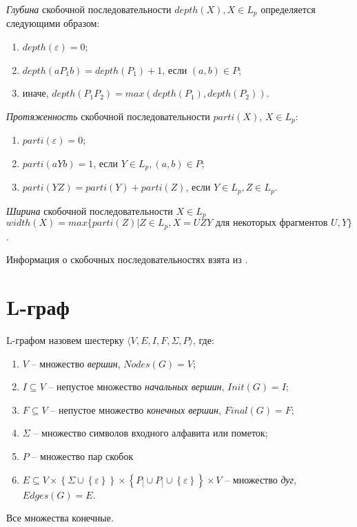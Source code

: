 \emph{Глубина} скобочной последовательности $depth(X), X \in L_p$ определяется следующими образом:
\begin{enumerate}[label=\arabic*)]
    \item $depth(\varepsilon) = 0$;
    \item $depth(a P_1 b) = depth(P_1) + 1$, если $(a, b) \in P$;
    \item иначе, $depth(P_1 P_2) = max(depth(P_1), depth(P_2))$.
\end{enumerate}

\emph{Протяженность} скобочной последовательности $parti(X)$, $X \in L_p$:
\begin{enumerate}[label=\arabic*)]
    \item $parti(\varepsilon) = 0$;
    \item $parti(aYb) = 1$, если $Y \in L_p, (a, b) \in P$;
    \item $parti(YZ) = parti(Y) + parti(Z)$, если $Y \in L_p, Z \in L_p$.
\end{enumerate}

\emph{Ширина} скобочной последовательности $X \in L_p$ $width(X) = max \{ parti(Z) \vert Z \in L_p, X = UZY \text{ для некоторых фрагментов } U, Y \}$.

Информация о скобочных последовательностях взята из \cite{stan1}.

\section{L-граф}
L-графом назовем шестерку $\langle V,E,I,F,\Sigma,P\rangle$, где:
\begin{enumerate}[label=\arabic*)]
    \item $V$ -- множество \emph{вершин}, $Nodes(G) = V$;
    \item $I \subseteq V$ -- непустое множество \emph{начальных вершин}, $Init(G) = I$;
    \item $F \subseteq V$ -- непустое множество \emph{конечных вершин}, $Final(G) = F$;
    \item $\Sigma$ -- множество символов входного алфавита или пометок;
    \item $P$ -- множество пар скобок
    \item $E \subseteq V 
                    \times \left\{ \Sigma \cup \left\{ \varepsilon \right\}\right\} 
                    \times \left\{ P_[ \cup P_] \cup \left\{ \varepsilon \right\} \right\} 
                    \times V $
        -- множество \emph{дуг}, $Edges(G) = E$.
\end{enumerate}
Все множества конечные.

